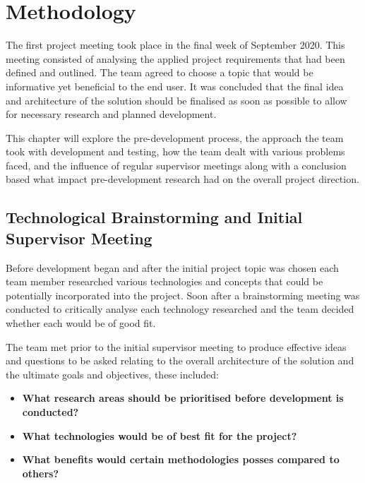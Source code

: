 \chapter{Methodology}
The first project meeting took place in the final week of September 2020. This meeting consisted of analysing the applied project requirements that had been defined and outlined. The team agreed to choose a topic that would be informative yet beneficial to the end user. It was concluded that the final idea and architecture of the solution should be finalised as soon as possible to allow for necessary research and planned development.

\vspace{5mm} %

This chapter will explore the pre-development process, the approach the team took with development and testing, how the team dealt with various problems faced, and the influence of regular supervisor meetings along with a conclusion based what impact pre-development research had on the overall project direction.

\section{Technological Brainstorming and Initial Supervisor Meeting}
Before development began and after the initial project topic was chosen each team member researched various technologies and concepts that could be potentially incorporated into the project. Soon after a brainstorming meeting was conducted to critically analyse each technology researched and the team decided whether each would be of good fit.

\vspace{5mm} %

The team met prior to the initial supervisor meeting to produce effective ideas and questions to be asked relating to the overall architecture of the solution and the ultimate goals and objectives, these included:

\begin{itemize}

    \item \textbf{What research areas should be prioritised before development is conducted?}

    \item \textbf{What technologies would be of best fit for the project?}

    \item \textbf{What benefits would certain methodologies posses compared to others?}

\end{itemize}

